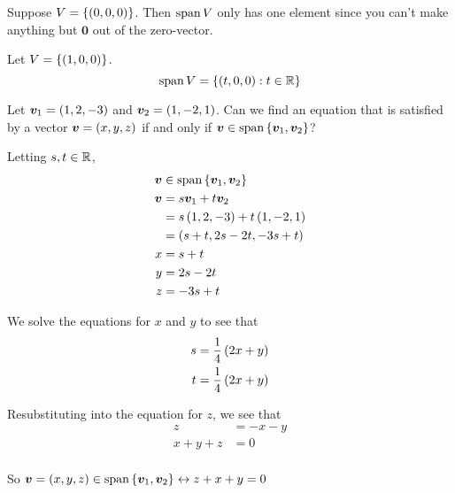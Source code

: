\documentclass[11pt]{article}
\begin{document}

\begin{example}
  
  Suppose $V = \left \{ \left ( 0, 0, 0 \right) \right \}$.
  Then $\operatorname{span} V$ only has one element since you can't make anything but $\bm{0}$ out of the zero-vector.
\end{example}

\begin{example}

  Let $V = \left \{ \left ( 1, 0, 0 \right) \right \}$.
  $$
  \operatorname{span} V = \left \{ \left ( t, 0, 0 \right) : t \in \mathbb R \right \}
  $$
\end{example}

\begin{example}
  
  Let $\bm{v}_1 = \left ( 1, 2, -3 \right)$ and $\bm{v}_2 = \left ( 1, -2, 1 \right)$.
  Can we find an equation that is satisfied by a vector $\bm{v} = \left ( x, y, z \right)$ if and only if $\bm{v} \in \operatorname{span} \left \{ \bm{v}_1, \bm{v}_2 \right \}$?

  Letting $s,t \in \mathbb R$,
  \begin{align*}
    \bm{v} &\in \operatorname{span} \left \{ \bm{v}_1, \bm{v}_2 \right \} \\
    \bm{v} &= s \bm{v}_1 + t \bm{v}_2 \\
           &= s \left ( 1,2,-3 \right) + t \left ( 1, -2, 1 \right) \\
           &= \left ( s+t, 2s-2t, -3s+t \right) \\
    x &= s+t \\
    y &= 2s-2t \\
    z &= -3s+t \\
  \end{align*}

  We solve the equations for $x$ and $y$ to see that
  \begin{align*}
    s &= \frac{1}{4} \left ( 2x+y \right) \\
    t &= \frac{1}{4} \left ( 2x+y \right) \\
  \end{align*}

  Resubstituting into the equation for $z$, we see that
  \begin{align*}
    z &= -x-y \\
    x+y+z &= 0 \\
  \end{align*}

  So $\bm{v} = \left ( x, y, z \right) \in \operatorname{span} \left \{ \bm{v}_1, \bm{v}_2 \right \} \leftrightarrow z+x+y=0$
\end{example}
\end{document}

